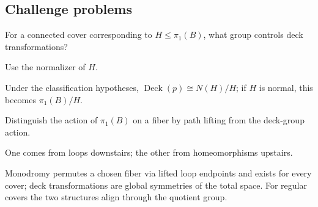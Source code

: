\subsection*{Challenge problems}

\begin{exercise}\label{exr:viii12-ped-15}
For a connected cover corresponding to $H\le\pi_1(B)$, what group controls deck transformations?
\end{exercise}
\begin{hint}
Use the normalizer of $H$.
\end{hint}
\begin{solution}
Under the classification hypotheses, $\operatorname{Deck}(p)\cong N(H)/H$; if $H$ is normal, this becomes $\pi_1(B)/H$.
\end{solution}

\begin{exercise}\label{exr:viii12-ped-16}
Distinguish the action of $\pi_1(B)$ on a fiber by path lifting from the deck-group action.
\end{exercise}
\begin{hint}
One comes from loops downstairs; the other from homeomorphisms upstairs.
\end{hint}
\begin{solution}
Monodromy permutes a chosen fiber via lifted loop endpoints and exists for every cover; deck transformations are global symmetries of the total space.  For regular covers the two structures align through the quotient group.
\end{solution}

